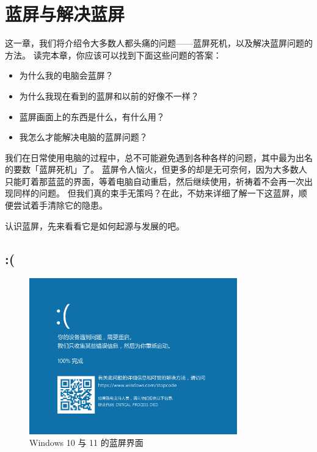 \chapter{蓝屏与解决蓝屏}
\label{recover-from-bsod}

\begin{intro}
  这一章，我们将介绍令大多数人都头痛的问题——蓝屏死机，以及解决蓝屏问题的方法。
  读完本章，你应该可以找到下面这些问题的答案：
  
  \begin{itemize}
    \item 为什么我的电脑会蓝屏？
    \item 为什么我现在看到的蓝屏和以前的好像不一样？
    \item 蓝屏画面上的东西是什么，有什么用？
    \item 我怎么才能解决电脑的蓝屏问题？
  \end{itemize}
\end{intro}

我们在日常使用电脑的过程中，总不可能避免遇到各种各样的问题，其中最为出名的要数「蓝屏死机」了。
蓝屏令人恼火，但更多的却是无可奈何，因为大多数人只能盯着那蓝蓝的界面，等着电脑自动重启，然后继续使用，祈祷着不会再一次出现同样的问题。
但我们真的束手无策吗？在此，不妨来详细了解一下这蓝屏，顺便尝试着手清除它的隐患。

认识蓝屏，先来看看它是如何起源与发展的吧。

\section{:(}

\begin{figure}[htb!]
  \centering
  \includegraphics[width=9cm]{assets/Win-10-BSoD.png}
  \caption{Windows 10 与 11 的蓝屏界面}
  \label{Win-10-BSoD}
\end{figure}

